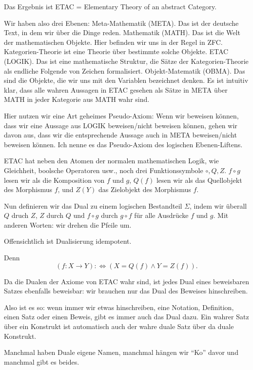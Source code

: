 \documentclass[a4paper]{amsart}
\theoremstyle{definition}
\begin{document}
Das Ergebnis ist ETAC = Elementary Theory of an abstract Category. 

Wir haben also drei Ebenen: Meta-Mathematik (META). Das ist der deutsche Text, in dem wir über die Dinge reden. Mathematik (MATH). Das ist die Welt der mathematischen Objekte. Hier befinden wir uns in der Regel in ZFC. Kategorien-Theorie ist eine Theorie über bestimmte solche Objekte. ETAC (LOGIK). Das ist eine mathematische Struktur, die Sätze der Kategorien-Theorie als endliche Folgende von Zeichen formalisiert. Objekt-Matematik (OBMA). Das sind die Objekte, die wir uns mit den Variablen bezeichnet denken. Es ist intuitiv klar, dass alle wahren Aussagen in ETAC gesehen als Sätze in META über MATH in jeder Kategorie aus MATH wahr sind.

Hier nutzen wir eine Art geheimes Pseudo-Axiom: Wenn wir beweisen können, dass wir eine Aussage aus LOGIK beweisen/nicht beweisen können, gehen wir davon aus, dass wir die entsprechende Aussage auch in META beweisen/nicht beweisen können. Ich nenne es das Pseudo-Axiom des logischen Ebenen-Liftens.

ETAC hat neben den Atomen der normalen mathematischen Logik, wie Gleichheit, boolsche Operatoren usw., noch drei Funktionssymbole $\circ, Q, Z$. $f \circ g$ lesen wir als die Komposition von $f$ und $g$, $Q(f)$ lesen wir als das Quellobjekt des Morphismus $f$, und  $Z(Y)$ das Zielobjekt des Morphismus $f$.

Nun definieren wir das Dual zu einem logischen Bestandteil $\Sigma$, indem wir überall $Q$ druch $Z$, $Z$ durch $Q$ und $f \circ g$ durch $g \circ f$ für alle Ausdrücke $f$ und $g$. Mit anderen Worten: wir drehen die Pfeile um.

Offensichtlich ist Dualisierung idempotent.

Denn
\begin{equation}
   (f \colon X \to Y) :\Leftrightarrow (X=Q(f) \land Y=Z(f)).
\end{equation} 

Da die Dualen der Axiome von ETAC wahr sind, ist jedes Dual eines beweisbaren Satzes ebenfalls beweisbar: wir brauchen nur das Dual des Beweises hinschreiben.

Also ist es so: wenn immer wir etwas hinschreiben, eine Notation, Definition, einen Satz oder einen Beweis, gibt es immer auch das Dual dazu. Ein wahrer Satz über ein Konstrukt ist automatisch auch der wahre duale Satz über da duale Konstrukt.

Manchmal haben Duale eigene Namen, manchmal hängen wir "`Ko"' davor und manchmal gibt es beides.
\end{document}
